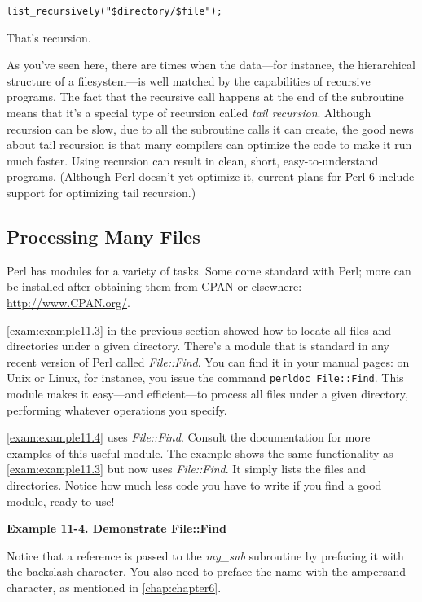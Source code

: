 \begin{lstlisting}
list_recursively("$directory/$file");
\end{lstlisting}

That's recursion.

As you've seen here, there are times when the data—for instance, the hierarchical structure of a filesystem—is well matched by the capabilities of recursive programs. The fact that the recursive call happens at the end of the subroutine means that it's a special type of recursion called \textit{tail recursion}. Although recursion can be slow, due to all the subroutine calls it can create, the good news about tail recursion is that many compilers can optimize the code to make it run much faster. Using recursion can result in clean, short, easy-to-understand programs. (Although Perl doesn't yet optimize it, current plans for Perl 6 include support for optimizing tail recursion.) 

\subsection{Processing Many Files}
\label{sect:section11.2.3}
Perl has modules for a variety of tasks. Some come standard with Perl; more can be installed after obtaining them from CPAN or elsewhere: \href{http://www.CPAN.org/}{http://www.CPAN.org/}.

\autoref{exam:example11.3} in the previous section showed how to locate all files and directories under a given directory. There's a module that is standard in any recent version of Perl called \textit{File::Find}. You can find it in your manual pages: on Unix or Linux, for instance, you issue the command \verb|perldoc File::Find|. This module makes it easy—and efficient—to process all files under a given directory, performing whatever operations you specify.

\autoref{exam:example11.4} uses \textit{File::Find}. Consult the documentation for more examples of this useful module. The example shows the same functionality as \autoref{exam:example11.3} but now uses \textit{File::Find}. It simply lists the files and directories. Notice how much less code you have to write if you find a good module, ready to use! 

\textbf{Example 11-4. Demonstrate File::Find}


Notice that a reference is passed to the \textit{my\_sub} subroutine by prefacing it with the backslash character. You also need to preface the name with the ampersand character, as mentioned in \autoref{chap:chapter6}.

